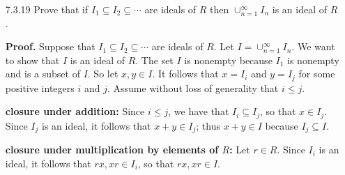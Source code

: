 \begin{enumerate}
      \textbf{Solution.}

      \begin{enumerate}
         \item \textbf{Proof.} Let $M = \{1, 2\}$, $R_1 = I$, $R_2 = J$. It
               follows by (b) that $I \cap J = R_1 \cap R_2$ is an ideal of $R$. 
               \qed
         \item \textbf{Proof.} Let $M$ be a nonempty indexing set such that
               $R_m$ is an ideal of $R$ for every $m \in M$. Let
               $X = \bigcap_{m\in M}R_m$. We claim that $M$ is an ideal of $R$.

               \textbf{nonempty and closure under addition:} This follows from
               Exercise 2.1.10(b) \\

               \textbf{closure under multiplication by elements of $R$:} Let
               $r \in R$ and $n \in M$, so that $n \in R_m$ for every $m \in M$.
               Since each $R_m$ is an ideal of $R$, it follows that
               $rn, nr \in R_m$ for each $m \in M$, so that $rn, rn \in M$, and
               thus, $M$ is closed under multiplication by elements of $R$. \\

               Conclude that $M$ is an ideal of $R$. \qed
      \end{enumerate}
   \item[7.3.19]  Prove that if $I_1 \subseteq I_2 \subseteq \cdots$ are ideals
                  of $R$ then $\cup_{n=1}^\infty I_n$ is an ideal of $R$.

      \textbf{Proof.} Suppose that $I_1 \subseteq I_2 \subseteq \cdots$ are 
      ideals of $R$. Let $I = \cup_{n=1}^\infty I_n$. We want to show that $I$
      is an ideal of $R$. The set $I$ is nonempty because $I_1$ is nonempty and
      is a subset of $I$. So let $x, y \in I$. It follows that $x = I_i$ and
      $y = I_j$ for some positive integers $i$ and $j$. Assume without loss of 
      generality that $i \le j$.

      \textbf{closure under addition:} Since $i \le j$, we have that
      $I_i \subseteq I_j$, so that $x \in I_j$. Since $I_j$ is an ideal, it 
      follows that $x + y \in I_j$; thus $x+y \in I$ because $I_j \subseteq I$.

      \textbf{closure under multiplication by elements of $R$:} Let $r \in R$.
      Since $I_i$ is an ideal, it follows that $rx, xr \in I_i$, so that
      $rx, xr \in I$. \\


\end{enumerate}
